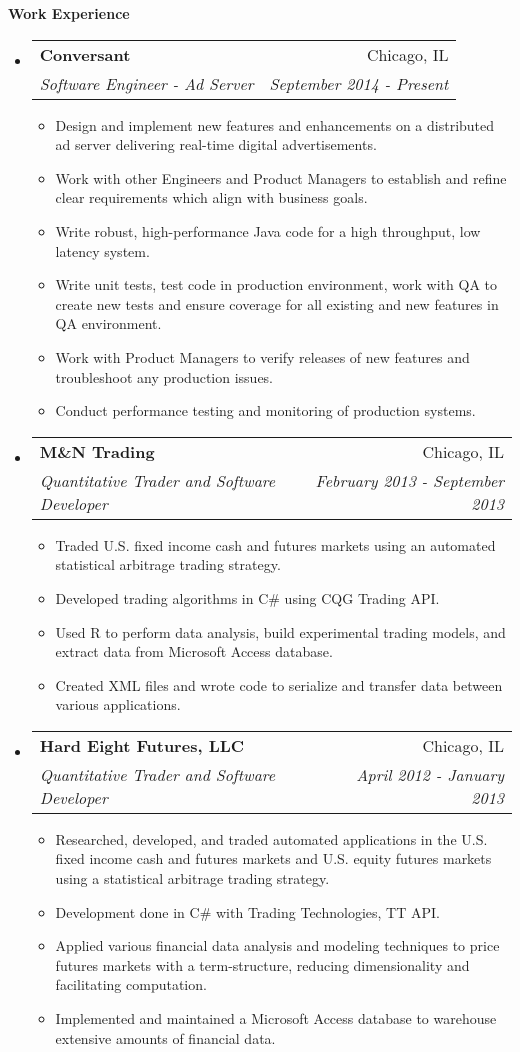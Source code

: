 \documentclass[letterpaper,10pt]{article}
\makeatletter
\newcommand{\resitem}[1]{\item #1 \vspace{-2pt}}
\newcommand{\resheading}[1]{{\large \colorbox{mygrey}{\begin{minipage}{\textwidth}{\textbf{#1 \vphantom{p\^{E}}}}\end{minipage}}}}
\newcommand{\ressubheading}[4]{
\begin{tabular*}{7.0in}{l@{\extracolsep{\fill}}r}
		\textbf{#1} & #2 \\
		\textit{#3} & \textit{#4} \\
\end{tabular*}\vspace{-6pt}}
\makeatother
\begin{document}
\resheading{Work Experience}
\begin{itemize}
\item
	\ressubheading{Conversant}{Chicago, IL}{Software Engineer - Ad Server}{September 2014 - Present}
	\begin{itemize}
		\resitem{Design and implement new features and enhancements on a distributed ad server delivering real-time digital advertisements.}
		\resitem{Work with other Engineers and Product Managers to establish and refine clear requirements which align with business goals.}
		\resitem{Write robust, high-performance Java code for a high throughput, low latency system.}
		\resitem{Write unit tests, test code in production environment, work with QA to create new tests and ensure coverage for all existing and new features in QA environment.}
		\resitem{Work with Product Managers to verify releases of new features and troubleshoot any production issues.}
		\resitem{Conduct performance testing and monitoring of production systems.}
	\end{itemize}
\item
	\ressubheading{M\&N Trading}{Chicago, IL}{Quantitative Trader and Software Developer}{February 2013 - September 2013}
	\begin{itemize}
		\resitem{Traded U.S. fixed income cash and futures markets using an automated statistical arbitrage 
   trading strategy.}
		\resitem{Developed trading algorithms in C\# using CQG Trading API.}
		\resitem{Used R to perform data analysis, build experimental trading models, and extract data from 
   Microsoft Access database.}
		\resitem{Created XML files and wrote code to serialize and transfer data between various applications. }
	\end{itemize}
\item
	\ressubheading{Hard Eight Futures, LLC}{Chicago, IL}{Quantitative Trader and Software Developer}{April 2012 - January 2013}
	\begin{itemize}
		\resitem{Researched, developed, and traded automated applications in the U.S. fixed income cash and 
   futures markets and U.S. equity futures markets using a statistical arbitrage trading strategy.}
		\resitem{Development done in C\# with Trading Technologies, TT API.}
		\resitem{Applied various financial data analysis and modeling techniques to price futures markets with 
   a term-structure, reducing dimensionality and facilitating computation.}
        \resitem{Implemented and maintained a Microsoft Access database to warehouse extensive amounts of financial data.}
	\end{itemize}

\end{itemize}
\end{document}
